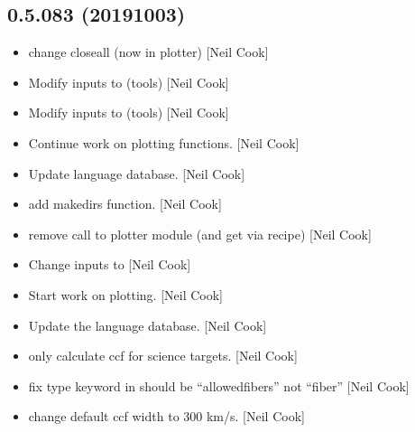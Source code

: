 \documentclass[a4paper,10pt,english]{report}
\begin{document}
\subsection{0.5.083 (2019\sphinxhyphen{}10\sphinxhyphen{}03)}
\label{\detokenize{misc/changelog:id79}}\begin{itemize}
\item {} 
 \sphinxhyphen{} change closeall (now in
plotter) {[}Neil Cook{]}

\item {} 
Modify inputs to  (tools) {[}Neil Cook{]}

\item {} 
Modify inputs to  (tools) {[}Neil Cook{]}

\item {} 
Continue work on plotting functions. {[}Neil Cook{]}

\item {} 
Update language database. {[}Neil Cook{]}

\item {} 
 \sphinxhyphen{} add makedirs function. {[}Neil Cook{]}

\item {} 
 \sphinxhyphen{} remove call to plotter module (and get via
recipe) {[}Neil Cook{]}

\item {} 
Change inputs to  {[}Neil Cook{]}

\item {} 
Start work on plotting. {[}Neil Cook{]}

\item {} 
Update the language database. {[}Neil Cook{]}

\item {} 
 \sphinxhyphen{} only calculate ccf for science targets.
{[}Neil Cook{]}

\item {} 
 \sphinxhyphen{} fix type keyword in 
should be “allowedfibers” not “fiber” {[}Neil Cook{]}

\item {} 
 \sphinxhyphen{} change default ccf
width to 300 km/s. {[}Neil Cook{]}


\end{itemize}
\end{document}
